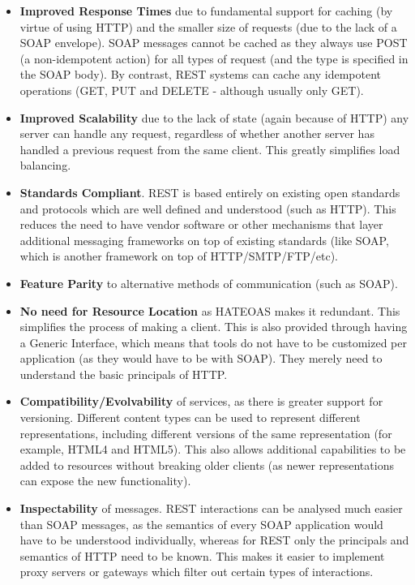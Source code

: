 \documentclass{article}
\begin{document}
\begin{itemize}
    \item \textbf{Improved Response Times} due to fundamental support for caching (by virtue of using HTTP) and the smaller size of requests (due to the lack of a SOAP envelope). SOAP messages cannot be cached as they always use POST (a non-idempotent action) for all types of request (and the type is specified in the SOAP body). By contrast, REST systems can cache any idempotent operations (GET, PUT and DELETE - although usually only GET).
    \item \textbf{Improved Scalability} due to the lack of state (again because of HTTP) any server can handle any request, regardless of whether another server has handled a previous request from the same client. This greatly simplifies load balancing. 
    \item \textbf{Standards Compliant}. REST is based entirely on existing open standards and protocols which are well defined and understood (such as HTTP). This reduces the need to have vendor software or other mechanisms that layer additional messaging frameworks on top of existing standards (like SOAP, which is another framework on top of HTTP/SMTP/FTP/etc).
    \item \textbf{Feature Parity} to alternative methods of communication (such as SOAP).
    \item \textbf{No need for Resource Location} as HATEOAS makes it redundant. This simplifies the process of making a client. This is also provided through having a Generic Interface, which means that tools do not have to be customized per application (as they would have to be with SOAP). They merely need to understand the basic principals of HTTP. 
    \item \textbf{Compatibility/Evolvability} of services, as there is greater support for versioning. Different content types can be used to represent different representations, including different versions of the same representation (for example, HTML4 and HTML5). This also allows additional capabilities to be added to resources without breaking older clients (as newer representations can expose the new functionality).
    \item \textbf{Inspectability} of messages. REST interactions can be analysed much easier than SOAP messages, as the semantics of every SOAP application would have to be understood individually, whereas for REST only the principals and semantics of HTTP need to be known. This makes it easier to implement proxy servers or gateways which filter out certain types of interactions. 
\end{itemize}
\end{document}
